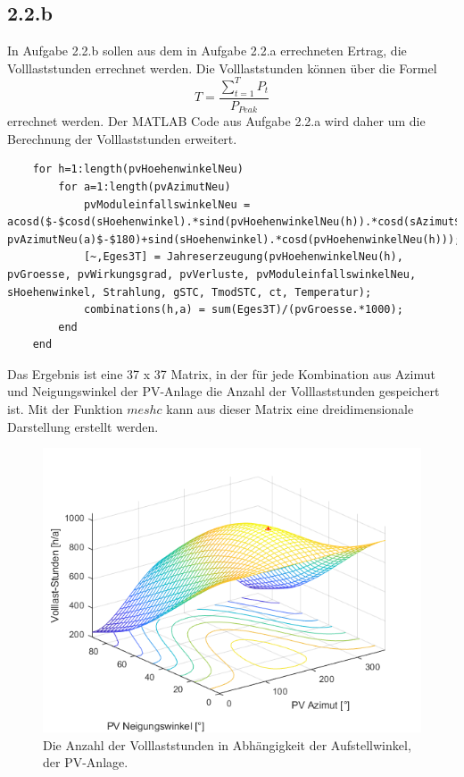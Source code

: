 \documentclass[a4paper,12pt]{article}
\begin{document}
	\subsection{2.2.b}
	In Aufgabe 2.2.b sollen aus dem in Aufgabe 2.2.a errechneten Ertrag, die Volllaststunden errechnet werden.\newline
	Die Volllaststunden können über die Formel
	\begin{equation}
	T=\frac{\sum \limits_{t=1}^T P_t}{P_{Peak}}
	\end{equation}
	errechnet werden.\newline
	Der MATLAB Code aus Aufgabe 2.2.a wird daher um die Berechnung der Volllaststunden erweitert.
	\begin{lstlisting}
	for h=1:length(pvHoehenwinkelNeu)
		for a=1:length(pvAzimutNeu)
			pvModuleinfallswinkelNeu = acosd($-$cosd(sHoehenwinkel).*sind(pvHoehenwinkelNeu(h)).*cosd(sAzimut$-$ pvAzimutNeu(a)$-$180)+sind(sHoehenwinkel).*cosd(pvHoehenwinkelNeu(h)));
			[~,Eges3T] = Jahreserzeugung(pvHoehenwinkelNeu(h), pvGroesse, pvWirkungsgrad, pvVerluste, pvModuleinfallswinkelNeu, sHoehenwinkel, Strahlung, gSTC, TmodSTC, ct, Temperatur);
			combinations(h,a) = sum(Eges3T)/(pvGroesse.*1000);
		end
	end
	\end{lstlisting}
	Das Ergebnis ist eine 37 x 37 Matrix, in der für jede Kombination aus Azimut und Neigungswinkel der PV-Anlage die Anzahl der Volllaststunden gespeichert ist.\newline
	Mit der Funktion $meshc$ kann aus dieser Matrix eine dreidimensionale Darstellung erstellt werden.
	\begin{figure}[H]
		\centering
		\includegraphics[width=12cm]{img/results/VolllaststundenAbhaengigVomWinkel}
		\caption{Die Anzahl der Volllaststunden in Abhängigkeit der Aufstellwinkel, der PV-Anlage.}
	\end{figure}
\end{document}
